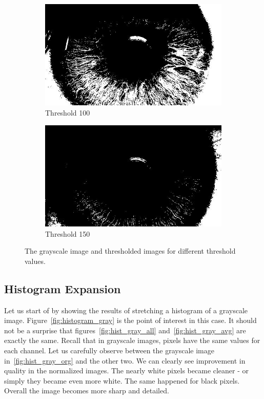\documentclass{article}
\begin{document}
\begin{figure}[H]
\begin{subfigure}[b]{0.5\linewidth}
\centering
  \includegraphics[width=0.9\linewidth]{res/tresh100.jpg}
  \caption{Threshold 100}
   \label{fig:original}
\end{subfigure}%
\begin{subfigure}[b]{0.5\linewidth}
\centering
  \includegraphics[width=0.9\linewidth]{res/tresh150.jpg}
  \caption{Threshold 150}
   \label{fig:original}
\end{subfigure}%


  
  \caption{The grayscale image and thresholded images for different threshold values.}
  \vspace{-12pt}
  \label{fig:threshold}

\end{figure}


\subsection{Histogram Expansion}
Let us start of by showing the results of stretching a histogram of a grayscale image. Figure~\ref{fig:histogram_gray} is the point of interest in this case. It should not be a surprise that figures~\ref{fig:hist_gray_all} and~\ref{fig:hist_gray_avg} are exactly the same. Recall that in grayscale images, pixels have the same values for each channel. Let us carefully observe between the grayscale image in~\ref{fig:hist_gray_org} and the other two.
We can clearly see improvement in quality in the normalized images. The nearly white pixels became cleaner - or simply they became even more white. The same happened for black pixels. Overall the image becomes more sharp and detailed.
\end{document}
